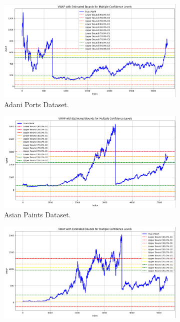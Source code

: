 \begin{figure}[H]
    \centering
        \begin{minipage}{0.6\textwidth}
            \centering
            \begin{subfigure}[b]{0.8\textwidth}
                \centering
                \includegraphics[width=\textwidth]{Chap02/figs/Gaussian_AdaniPorts.png}
                \caption{Adani Ports Dataset.}
            \end{subfigure}
            \hfill
            \begin{subfigure}[b]{0.8\textwidth}
                \centering
                \includegraphics[width=\textwidth]{Chap02/figs/Gaussian_AsianPaints.png}
                \caption{Asian Paints Dataset.}
            \end{subfigure}
            \begin{subfigure}[b]{0.8\textwidth}
                \centering
                \includegraphics[width=\textwidth]{Chap02/figs/Gaussian_AxisBank.png}

\end{subfigure}
\end{minipage}
\end{figure}
